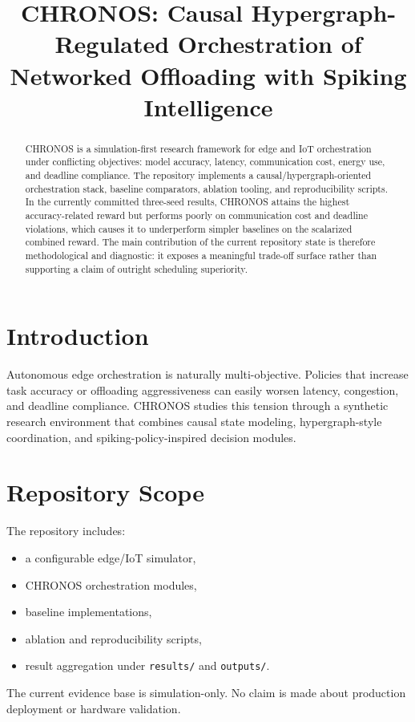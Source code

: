\documentclass[conference]{IEEEtran}
\title{CHRONOS: Causal Hypergraph-Regulated Orchestration of Networked Offloading with Spiking Intelligence}
\author{\IEEEauthorblockN{George David Tsitlauri}
\IEEEauthorblockA{\textit{Dept. of Informatics \& Telecommunications}\\
\textit{University of Thessaly, Greece}\\
 gdtsitlauri@gmail.com}}
\begin{document}
\maketitle

\begin{abstract}
CHRONOS is a simulation-first research framework for edge and IoT orchestration under conflicting objectives: model accuracy, latency, communication cost, energy use, and deadline compliance. The repository implements a causal/hypergraph-oriented orchestration stack, baseline comparators, ablation tooling, and reproducibility scripts. In the currently committed three-seed results, CHRONOS attains the highest accuracy-related reward but performs poorly on communication cost and deadline violations, which causes it to underperform simpler baselines on the scalarized combined reward. The main contribution of the current repository state is therefore methodological and diagnostic: it exposes a meaningful trade-off surface rather than supporting a claim of outright scheduling superiority.
\end{abstract}

\section{Introduction}
Autonomous edge orchestration is naturally multi-objective. Policies that increase task accuracy or offloading aggressiveness can easily worsen latency, congestion, and deadline compliance. CHRONOS studies this tension through a synthetic research environment that combines causal state modeling, hypergraph-style coordination, and spiking-policy-inspired decision modules.

\section{Repository Scope}
The repository includes:
\begin{itemize}
\item a configurable edge/IoT simulator,
\item CHRONOS orchestration modules,
\item baseline implementations,
\item ablation and reproducibility scripts,
\item result aggregation under \texttt{results/} and \texttt{outputs/}.
\end{itemize}
The current evidence base is simulation-only. No claim is made about production deployment or hardware validation.
\end{document}
